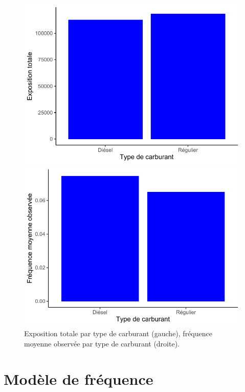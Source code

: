 \begin{figure}
\caption{\label{fig:ExpoTotFreqMoyGas} Exposition totale par type de carburant (gauche), fréquence moyenne observée par type de carburant (droite).}
\begin{minipage}{0.4\linewidth}
\includegraphics[scale=0.5]{Graphiques/ExpoTotGas}
\end{minipage}
\hfill
\begin{minipage}{0.4\linewidth}
\includegraphics[scale=0.5]{Graphiques/FreqMoyGas}
\end{minipage}
\end{figure}




\section{Modèle de fréquence}
\label{sec:app:modele}

